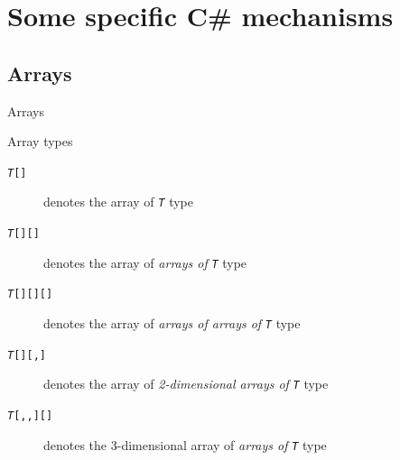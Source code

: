\documentclass[presentation]{beamer}
\begin{document}


\section{Some specific C\# mechanisms}
\renewcommand{\codepath}[1]{../../code/lecture-02/#1}

\subsection{Arrays}

\begin{frame}{\dotnet Arrays}
    \begin{block}{Array types}
        \begin{description}
            \item[\texttt{\textit{T}\alert{[]}}] denotes the \alert{array of \texttt{\textit{T}}} type
            \item[\texttt{\textit{T}\alert{[][]}}] denotes the \alert{array of \emph{arrays of} \texttt{\textit{T}}} type
            \item[\texttt{\textit{T}\alert{[][][]}}] denotes the \alert{array of \emph{arrays of arrays of} \texttt{\textit{T}}} type
            \item[\texttt{\textit{T}\alert{[][,]}}] denotes the \alert{array of \emph{2-dimensional arrays of} \texttt{\textit{T}}} type
            \item[\texttt{\textit{T}\alert{[,,][]}}] denotes the \alert{3-dimensional array of \emph{arrays of} \texttt{\textit{T}}} type
        \end{description}
    \end{block}
\end{frame}
\end{document}
